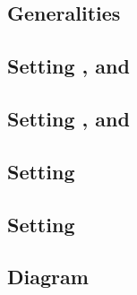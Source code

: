 \subsection{Generalities}                                                                                              \label{bls: generalities for malformed and wellformed}          
\subsection{Setting \malformedDataInternalBit, \malformedDataInternalAcc{} and \malformedDataInternalTot}    \label{bls: malformed internal bit acc justification}                    
\subsection{Setting \malformedDataExternalBit, \malformedDataExternalAcc{} and \malformedDataExternalTot}    \label{bls: malformed external bit acc justification}                    
\subsection{Setting \nontrivialPairOfPointsBit{}}                                                                         \label{bls: setting nontrivial pair of points bit}                  
\subsection{Setting \nontrivialPairOfPointsAcc{}}                                                                      \label{bls: setting nontrivial pair of points acc}              
\subsection{Diagram}                                                                                                   \label{bls: setting diagrams}                                   
